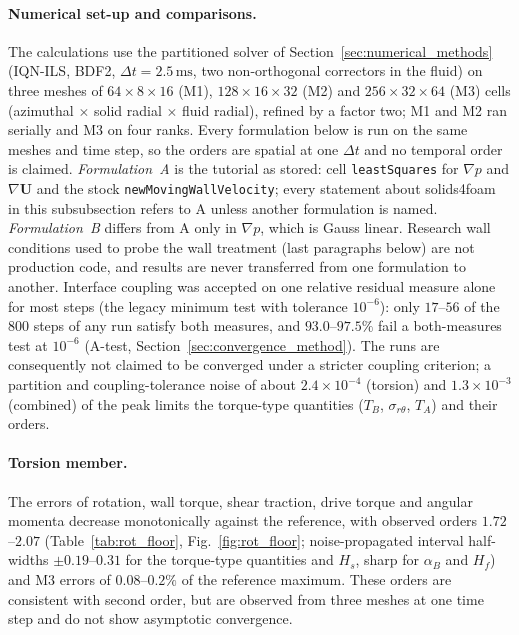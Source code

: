 \paragraph{Numerical set-up and comparisons.}
The calculations use the partitioned solver of Section~\ref{sec:numerical_methods} (IQN-ILS, BDF2, $\Delta t=2.5\,\mathrm{ms}$, two non-orthogonal correctors in the fluid) on three meshes of $64\times8\times16$ (M1), $128\times16\times32$ (M2) and $256\times32\times64$ (M3) cells (azimuthal $\times$ solid radial $\times$ fluid radial), refined by a factor two; M1 and M2 ran serially and M3 on four ranks.
Every formulation below is run on the same meshes and time step, so the orders are spatial at one $\Delta t$ and no temporal order is claimed.
\emph{Formulation~A} is the tutorial as stored: cell \texttt{leastSquares} for $\nabla p$ and $\nabla\mathbf{U}$ and the stock \texttt{newMovingWallVelocity}; every statement about solids4foam in this subsubsection refers to A unless another formulation is named.
\emph{Formulation~B} differs from A only in $\nabla p$, which is Gauss linear.
Research wall conditions used to probe the wall treatment (last paragraphs below) are not production code, and results are never transferred from one formulation to another.
Interface coupling was accepted on one relative residual measure alone for most steps (the legacy minimum test with tolerance $10^{-6}$): only $17$--$56$ of the 800 steps of any run satisfy both measures, and $93.0$--$97.5\%$ fail a both-measures test at $10^{-6}$ (A-test, Section~\ref{sec:convergence_method}).
The runs are consequently not claimed to be converged under a stricter coupling criterion; a partition and coupling-tolerance noise of about $2.4\times10^{-4}$ (torsion) and $1.3\times10^{-3}$ (combined) of the peak limits the torque-type quantities ($T_B$, $\sigma_{r\theta}$, $T_A$) and their orders.

\paragraph{Torsion member.}
The errors of rotation, wall torque, shear traction, drive torque and angular momenta decrease monotonically against the reference, with observed orders $1.72$--$2.07$ (Table~\ref{tab:rot_floor}, Fig.~\ref{fig:rot_floor}; noise-propagated interval half-widths $\pm0.19$--$0.31$ for the torque-type quantities and $H_s$, sharp for $\alpha_B$ and $H_f$) and M3 errors of $0.08$--$0.2\%$ of the reference maximum.
These orders are consistent with second order, but are observed from three meshes at one time step and do not show asymptotic convergence.

